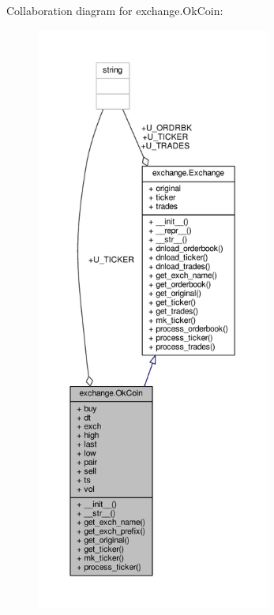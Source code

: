 Collaboration diagram for exchange.\+Ok\+Coin\+:
\nopagebreak
\begin{figure}[H]
\begin{center}
\leavevmode
\includegraphics[height=550pt]{classexchange_1_1_ok_coin__coll__graph}
\end{center}
\end{figure}
